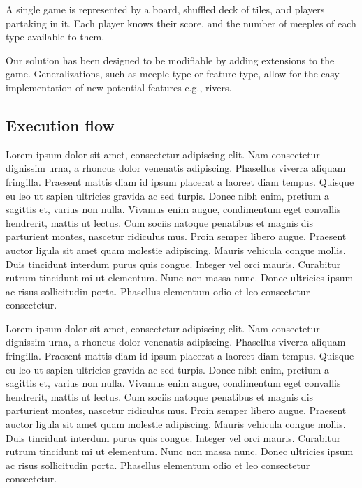 A single game is represented by a board, shuffled deck of tiles, and players partaking in it. Each player knows their score, and the number of meeples of each type available to them.

Our solution has been designed to be modifiable by adding extensions to the game. Generalizations, such as meeple type or feature type, allow for the easy implementation of new potential features e.g., rivers.

\subsection{Execution flow}
Lorem ipsum dolor sit amet, consectetur adipiscing elit. Nam consectetur dignissim urna, a rhoncus dolor venenatis adipiscing. Phasellus viverra aliquam fringilla. Praesent mattis diam id ipsum placerat a laoreet diam tempus. Quisque eu leo ut sapien ultricies gravida ac sed turpis. Donec nibh enim, pretium a sagittis et, varius non nulla. Vivamus enim augue, condimentum eget convallis hendrerit, mattis ut lectus. Cum sociis natoque penatibus et magnis dis parturient montes, nascetur ridiculus mus. Proin semper libero augue. Praesent auctor ligula sit amet quam molestie adipiscing. Mauris vehicula congue mollis. Duis tincidunt interdum purus quis congue. Integer vel orci mauris. Curabitur rutrum tincidunt mi ut elementum. Nunc non massa nunc. Donec ultricies ipsum ac risus sollicitudin porta. Phasellus elementum odio et leo consectetur consectetur. 

Lorem ipsum dolor sit amet, consectetur adipiscing elit. Nam consectetur dignissim urna, a rhoncus dolor venenatis adipiscing. Phasellus viverra aliquam fringilla. Praesent mattis diam id ipsum placerat a laoreet diam tempus. Quisque eu leo ut sapien ultricies gravida ac sed turpis. Donec nibh enim, pretium a sagittis et, varius non nulla. Vivamus enim augue, condimentum eget convallis hendrerit, mattis ut lectus. Cum sociis natoque penatibus et magnis dis parturient montes, nascetur ridiculus mus. Proin semper libero augue. Praesent auctor ligula sit amet quam molestie adipiscing. Mauris vehicula congue mollis. Duis tincidunt interdum purus quis congue. Integer vel orci mauris. Curabitur rutrum tincidunt mi ut elementum. Nunc non massa nunc. Donec ultricies ipsum ac risus sollicitudin porta. Phasellus elementum odio et leo consectetur consectetur. 


